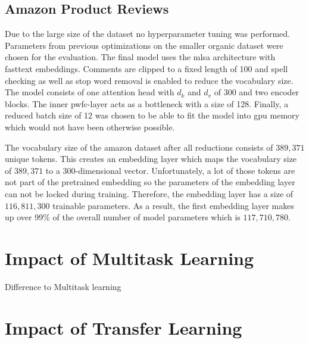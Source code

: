 \subsection{Amazon Product Reviews}
\label{sec:06_ResultsAmazon}

Due to the large size of the dataset no hyperparameter tuning was performed. Parameters from previous optimizations on the smaller organic dataset were chosen for the evaluation. The final model uses the \gls{mlsa} architecture with fasttext embeddings. Comments are clipped to a fixed length of 100 and spell checking as well as stop word removal is enabled to reduce the vocabulary size. The model consists of one attention head with $d_k$ and $d_v$ of 300 and two encoder blocks. The inner \gls{pwfc}-layer acts as a bottleneck with a size of 128. Finally, a reduced batch size of 12 was chosen to be able to fit the model into \gls{gpu} memory which would not have been otherwise possible.
\medskip

The vocabulary size of the amazon dataset after all reductions consists of $389,371$ unique tokens. This creates an embedding layer which maps the vocabulary size of $389,371$ to a 300-dimensional vector. Unfortunately, a lot of those tokens are not part of the pretrained embedding so the parameters of the embedding layer can not be locked during training. Therefore, the embedding layer has a size of $116,811,300$ trainable parameters. As a result, the first embedding layer makes up over 99\% of the overall number of model parameters which is $117,710,780$.



\section{Impact of Multitask Learning}
\label{sec:06_ResultsMultitask}

Difference to Multitask learning



\section{Impact of Transfer Learning}
\label{sec:06_ResultsTransfer}


